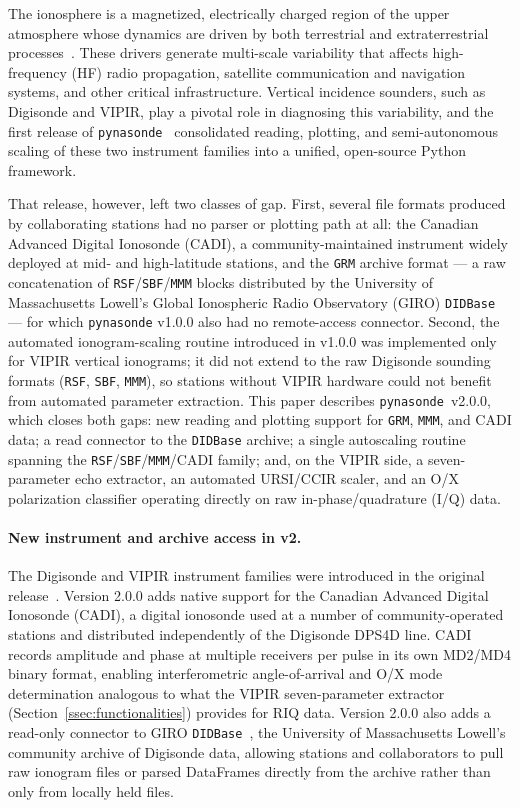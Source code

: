 \documentclass[12pt,a4paper]{article}
\begin{document}
The ionosphere is a magnetized, electrically charged region of the upper
atmosphere whose dynamics are driven by both terrestrial and extraterrestrial
processes~\cite{Chakraborty2026}. These drivers generate multi-scale
variability that affects high-frequency (HF) radio propagation, satellite
communication and navigation systems, and other critical infrastructure.
Vertical incidence sounders, such as Digisonde and VIPIR, play a pivotal role
in diagnosing this variability, and the first release of
\texttt{pynasonde}~\cite{Chakraborty2026} consolidated reading, plotting, and
semi-autonomous scaling of these two instrument families into a unified,
open-source Python framework.

That release, however, left two classes of gap. First, several file formats
produced by collaborating stations had no parser or plotting path at all: the
Canadian Advanced Digital Ionosonde (CADI), a community-maintained instrument
widely deployed at mid- and high-latitude stations, and the \texttt{GRM}
archive format --- a raw concatenation of \texttt{RSF}/\texttt{SBF}/\texttt{MMM}
blocks distributed by the University of Massachusetts Lowell's Global
Ionospheric Radio Observatory (GIRO) \texttt{DIDBase}~\cite{ReinischGalkin2011}
--- for which \texttt{pynasonde} v1.0.0 also had no remote-access connector.
Second, the automated ionogram-scaling routine introduced in v1.0.0 was
implemented only for VIPIR vertical ionograms; it did not extend to the raw
Digisonde sounding formats (\texttt{RSF}, \texttt{SBF}, \texttt{MMM}), so
stations without VIPIR hardware could not benefit from automated parameter
extraction. This paper describes \texttt{pynasonde}~v2.0.0, which closes both
gaps: new reading and plotting support for \texttt{GRM}, \texttt{MMM}, and
CADI data; a read connector to the \texttt{DIDBase} archive; a single
autoscaling routine spanning the \texttt{RSF}/\texttt{SBF}/\texttt{MMM}/CADI
family; and, on the VIPIR side, a seven-parameter echo extractor, an
automated URSI/CCIR scaler, and an O/X polarization classifier operating
directly on raw in-phase/quadrature (I/Q) data.

\paragraph{New instrument and archive access in v2.} The Digisonde and VIPIR
instrument families were introduced in the original
release~\cite{Chakraborty2026}. Version 2.0.0 adds native support for the
Canadian Advanced Digital Ionosonde (CADI), a digital ionosonde used at a
number of community-operated stations and distributed independently of the
Digisonde DPS4D line. CADI records amplitude and phase at multiple receivers
per pulse in its own MD2/MD4 binary format, enabling interferometric
angle-of-arrival and O/X mode determination analogous to what the VIPIR
seven-parameter extractor (Section~\ref{ssec:functionalities}) provides for
RIQ data. Version 2.0.0 also adds a read-only connector to GIRO
\texttt{DIDBase}~\cite{ReinischGalkin2011}, the University of Massachusetts
Lowell's community archive of Digisonde data, allowing stations and
collaborators to pull raw ionogram files or parsed DataFrames directly from
the archive rather than only from locally held files.
\end{document}
